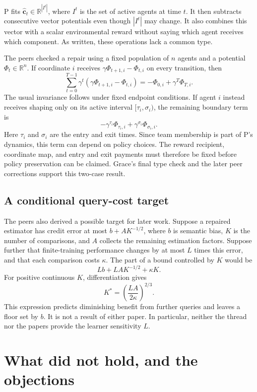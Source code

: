 \documentclass{article}
\begin{document}
P fits \(\widehat{\mathbf c}_t\in\mathbb R^{|I^t|}\), where \(I^t\) is the set of active agents at time \(t\).  It then subtracts consecutive vector potentials even though \(|I^t|\) may change.  It also combines this vector with a scalar environmental reward without saying which agent receives which component.  As written, these operations lack a common type.

The peers checked a repair using a fixed population of \(n\) agents and a potential \(\Phi_t\in\mathbb R^n\).  If coordinate \(i\) receives \(\gamma\Phi_{t+1,i}-\Phi_{t,i}\) on every transition, then
\[
 \sum_{t=0}^{T-1}\gamma^t
 (\gamma\Phi_{t+1,i}-\Phi_{t,i})
 =-\Phi_{0,i}+\gamma^T\Phi_{T,i}.
\]
The usual invariance follows under fixed endpoint conditions.  If agent \(i\) instead receives shaping only on its active interval \([\tau_i,\sigma_i)\), the remaining boundary term is
\[
 -\gamma^{\tau_i}\Phi_{\tau_i,i}
 +\gamma^{\sigma_i}\Phi_{\sigma_i,i}.
\]
Here \(\tau_i\) and \(\sigma_i\) are the entry and exit times.  Since team membership is part of P's dynamics, this term can depend on policy choices.  The reward recipient, coordinate map, and entry and exit payments must therefore be fixed before policy preservation can be claimed.  Grace's final type check and the later peer corrections support this two-case result.

\subsection{A conditional query-cost target}

The peers also derived a possible target for later work.  Suppose a repaired estimator has credit error at most \(b+AK^{-1/2}\), where \(b\) is semantic bias, \(K\) is the number of comparisons, and \(A\) collects the remaining estimation factors.  Suppose further that finite-training performance changes by at most \(L\) times this error, and that each comparison costs \(\kappa\).  The part of a bound controlled by \(K\) would be
\[
 Lb+LAK^{-1/2}+\kappa K.
\]
For positive continuous \(K\), differentiation gives
\[
 K^*=\left(\frac{LA}{2\kappa}\right)^{2/3}.
\]
This expression predicts diminishing benefit from further queries and leaves a floor set by \(b\).  It is not a result of either paper.  In particular, neither the thread nor the papers provide the learner sensitivity \(L\).

\section{What did not hold, and the objections}
\end{document}

